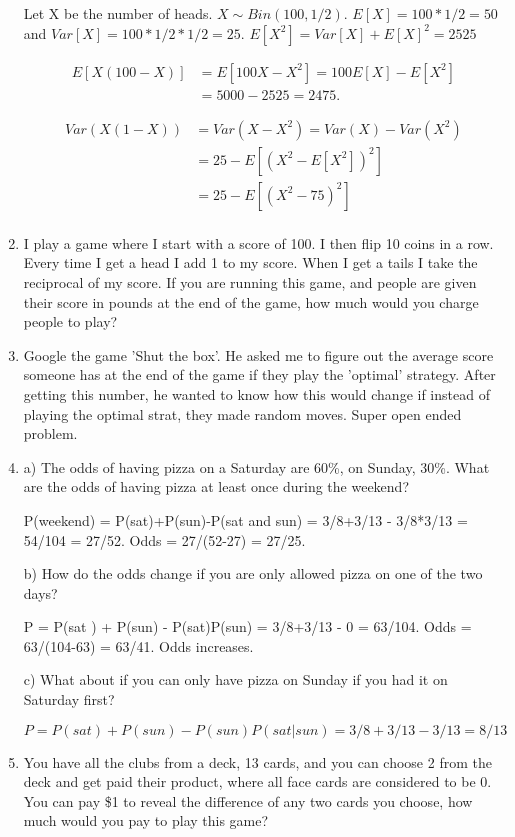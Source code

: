 \documentclass{article}
\begin{document}
\begin{enumerate}
     Let X be the number of heads. $X\sim Bin(100, 1/2)$. $E[X]=100*1/2=50 $ and $Var[X] = 100*1/2*1/2 = 25$. $E[X^2] = Var[X]+E[X]^2 = 2525$

     \begin{align*}
         E[X(100-X)] &= E[100X-X^2] = 100E[X]-E[X^2] \\
         &= 5000-2525 = 2475.
     \end{align*}

     \begin{align*}
         Var(X(1-X)) &= Var(X-X^2) = Var(X)-Var(X^2) \\ 
         &= 25- E[(X^2-E[X^2])^2] \\
         &= 25 - E[(X^2-75)^2] \\ 
     \end{align*}

     \item I play a game where I start with a score of 100. I then flip 10 coins in a row. Every time I get a head I add 1 to my score. When I get a tails I take the reciprocal of my score. If you are running this game, and people are given their score in pounds at the end of the game, how much would you charge people to play?


     \item Google the game 'Shut the box'. He asked me to figure out the average score someone has at the end of the game if they play the 'optimal' strategy. After getting this number, he wanted to know how this would change if instead of playing the optimal strat, they made random moves. Super open ended problem.

     \item a) The odds of having pizza on a Saturday are 60\%, on Sunday, 30\%. What are the odds of having pizza at least once during the weekend? 

     P(weekend) = P(sat)+P(sun)-P(sat and sun) = 3/8+3/13 - 3/8*3/13 = 54/104 = 27/52. Odds = 27/(52-27) = 27/25.
 
     b) How do the odds change if you are only allowed pizza on one of the two days?

     P = P(sat ) + P(sun) - P(sat)P(sun) = 3/8+3/13 - 0 = 63/104. Odds = 63/(104-63) = 63/41. Odds increases.
     
    c) What about if you can only have pizza on Sunday if you had it on Saturday first?

    $P = P(sat) + P(sun) - P(sun)P(sat|sun) = 3/8+3/13-3/13 = 8/13$

    \item You have all the clubs from a deck, 13 cards, and you can choose 2 from the deck and get paid their product, where all face cards are considered to be 0. You can pay \$1 to reveal the difference of any two cards you choose, how much would you pay to play this game?


\end{enumerate}
\end{document}
